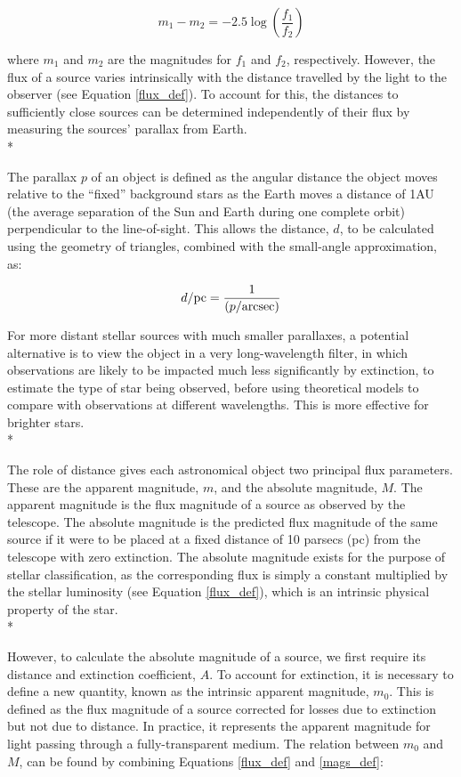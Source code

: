 \documentclass[12pt, a4paper]{report}
\begin{document}
\begin{equation}
\label{mags_def}
m_{1} - m_{2} = -2.5\log \left( \frac{f_{1}}{f_{2}} \right)
\end{equation}

where $m_{1}$ and $m_{2}$ are the magnitudes for $f_{1}$ and $f_{2}$, respectively. However, the flux of a source varies intrinsically with the distance travelled by the light to the observer (see Equation \ref{flux_def}). To account for this, the distances to sufficiently close sources can be determined independently of their flux by measuring the sources' parallax from Earth. \\*

The parallax $p$ of an object is defined as the angular distance the object moves relative to the ``fixed'' background stars as the Earth moves a distance of 1AU (the average separation of the Sun and Earth during one complete orbit) perpendicular to the line-of-sight. This allows the distance, $d$, to be calculated using the geometry of triangles, combined with the small-angle approximation, as:

\begin{equation}
d/\textnormal{pc} = \frac{1}{(p/\textnormal{arcsec})}
\end{equation}

For more distant stellar sources with much smaller parallaxes, a potential alternative is to view the object in a very long-wavelength filter, in which observations are likely to be impacted much less significantly by extinction, to estimate the type of star being observed, before using theoretical models to compare with observations at different wavelengths. This is more effective for brighter stars. \\*

The role of distance gives each astronomical object two principal flux parameters. These are the apparent magnitude, $m$, and the absolute magnitude, $M$. The apparent magnitude is the flux magnitude of a source as observed by the telescope. The absolute magnitude is the predicted flux magnitude of the same source if it were to be placed at a fixed distance of 10 parsecs (pc) from the telescope with zero extinction. The absolute magnitude exists for the purpose of stellar classification, as the corresponding flux is simply a constant multiplied by the stellar luminosity (see Equation \ref{flux_def}), which is an intrinsic physical property of the star. \\*

However, to calculate the absolute magnitude of a source, we first require its distance and extinction coefficient, $A$. To account for extinction, it is necessary to define a new quantity, known as the intrinsic apparent magnitude, $m_{0}$. This is defined as the flux magnitude of a source corrected for losses due to extinction but not due to distance. In practice, it represents the apparent magnitude for light passing through a fully-transparent medium. The relation between $m_{0}$ and $M$, can be found by combining Equations \ref{flux_def} and \ref{mags_def}:
\end{document}
